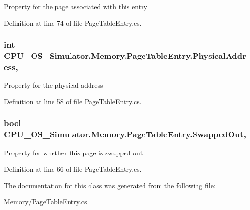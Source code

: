 Property for the page associated with this entry 



Definition at line 74 of file Page\+Table\+Entry.\+cs.

\hypertarget{class_c_p_u___o_s___simulator_1_1_memory_1_1_page_table_entry_ab52b7572557f81a63006101b4b348f8f}{}
\subsubsection[{Physical\+Address}]{\setlength{\rightskip}{0pt plus 5cm}int C\+P\+U\+\_\+\+O\+S\+\_\+\+Simulator.\+Memory.\+Page\+Table\+Entry.\+Physical\+Address\hspace{0.3cm}{\ttfamily [get]}, {\ttfamily [set]}}\label{class_c_p_u___o_s___simulator_1_1_memory_1_1_page_table_entry_ab52b7572557f81a63006101b4b348f8f}


Property for the physical address 



Definition at line 58 of file Page\+Table\+Entry.\+cs.

\hypertarget{class_c_p_u___o_s___simulator_1_1_memory_1_1_page_table_entry_a334eb63f388b19d1cf6907970f29e204}{}
\subsubsection[{Swapped\+Out}]{\setlength{\rightskip}{0pt plus 5cm}bool C\+P\+U\+\_\+\+O\+S\+\_\+\+Simulator.\+Memory.\+Page\+Table\+Entry.\+Swapped\+Out\hspace{0.3cm}{\ttfamily [get]}, {\ttfamily [set]}}\label{class_c_p_u___o_s___simulator_1_1_memory_1_1_page_table_entry_a334eb63f388b19d1cf6907970f29e204}


Property for whether this page is swapped out 



Definition at line 66 of file Page\+Table\+Entry.\+cs.



The documentation for this class was generated from the following file\+:\begin{DoxyCompactItemize}
\item 
Memory/\hyperlink{_page_table_entry_8cs}{Page\+Table\+Entry.\+cs}\end{DoxyCompactItemize}
